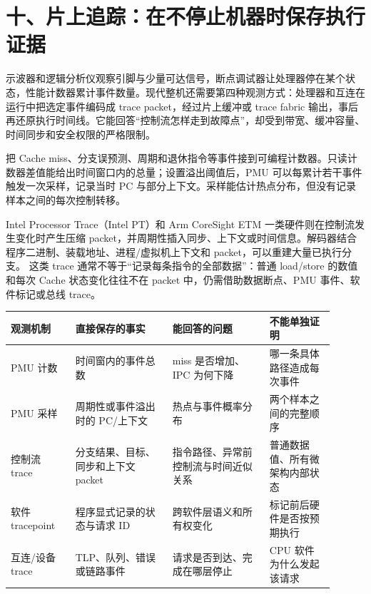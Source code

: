\section{十、片上追踪：在不停止机器时保存执行证据}

示波器和逻辑分析仪观察引脚与少量可达信号，断点调试器让处理器停在某个状态，性能计数器累计事件数量。现代整机还需要第四种观测方式：处理器和互连在运行中把选定事件编码成 trace packet，经过片上缓冲或 trace fabric 输出，事后再还原执行时间线。它能回答“控制流怎样走到故障点”，却受到带宽、缓冲容量、时间同步和安全权限的严格限制。


把 Cache miss、分支误预测、周期和退休指令等事件接到可编程计数器。只读计数器差值能给出时间窗口内的总量；设置溢出阈值后，PMU 可以每累计若干事件触发一次采样，记录当时 PC 与部分上下文。采样能估计热点分布，但没有记录样本之间的每次控制转移。

Intel Processor Trace（Intel PT）和 Arm CoreSight ETM 一类硬件则在控制流发生变化时产生压缩 packet，并周期性插入同步、上下文或时间信息。解码器结合程序二进制、装载地址、进程/虚拟机上下文和 packet，可以重建大量已执行分支。\cite{intel-pt}\cite{arm-trace} 这类 trace 通常不等于“记录每条指令的全部数据”：普通 load/store 的数值和每次 Cache 状态变化往往不在 packet 中，仍需借助数据断点、PMU 事件、软件标记或总线 trace。

\begin{longtable}{L{0.18\linewidth}L{0.27\linewidth}L{0.27\linewidth}L{0.18\linewidth}}
\toprule
观测机制 & 直接保存的事实 & 能回答的问题 & 不能单独证明 \\
\midrule
PMU 计数 & 时间窗内的事件总数 & miss 是否增加、IPC 为何下降 & 哪一条具体路径造成每次事件 \\\tablerowrule
PMU 采样 & 周期性或事件溢出时的 PC/上下文 & 热点与事件概率分布 & 两个样本之间的完整顺序 \\\tablerowrule
控制流 trace & 分支结果、目标、同步和上下文 packet & 指令路径、异常前控制流与时间近似关系 & 普通数据值、所有微架构内部状态 \\\tablerowrule
软件 tracepoint & 程序显式记录的状态与请求 ID & 跨软件层语义和所有权变化 & 标记前后硬件是否按预期执行 \\\tablerowrule
互连/设备 trace & TLP、队列、错误或链路事件 & 请求是否到达、完成在哪层停止 & CPU 软件为什么发起该请求 \\
\bottomrule
\end{longtable}

